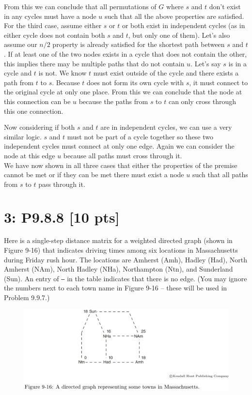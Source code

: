 \documentclass[12pt]{article}
\begin{document}
From this we can conclude that all permutations of $G$ where $s$ and $t$ don't exist in any cycles must have a node $u$ such that all the above properties are satisfied.\\

For the third case, assume either $s$ or $t$ or both exist in independent cycles (as in either cycle does not contain both $s$ and $t$, but only one of them). Let's also assume our $n/2$ property is already satisfied for the shortest path between $s$ and $t$. If at least one of the two nodes exists in a cycle that does not contain the other, this implies there may be multiple paths that do not contain $u$. Let's say $s$ is in a cycle and $t$ is not. We know $t$ must exist outside of the cycle and there exists a path from $t$ to $s$. Because $t$ does not form its own cycle with $s$, it must connect to the original cycle at only one place. From this we can conclude that the node at this connection can be $u$ because the paths from $s$ to $t$ can only cross through this one connection.

Now considering if both $s$ and $t$ are in independent cycles, we can use a very similar logic. $s$ and $t$ must not be part of a cycle together so these two independent cycles must connect at only one edge. Again we can consider the node at this edge $u$ because all paths must cross through it.\\

We have now shown in all three cases that either the properties of the premise cannot be met or if they can be met there must exist a node $u$ such that all paths from $s$ to $t$ pass through it.


\newpage
\section*{\textbf{3: P9.8.8} [10 pts]}
Here is a single-step distance matrix for a weighted directed graph (shown in Figure 9-16) that indicates driving times among six locations in Massachusetts during Friday rush hour. The locations are Amherst (Amh), Hadley (Had), North Amherst (NAm), North Hadley (NHa), Northampton (Ntn), and Sunderland (Sun). An entry of \texttt{--} in the table indicates that there is no edge. (You may ignore the numbers next to each town name in Figure 9-16 – these will be used in Problem 9.9.7.)

\begin{figure}[h]
    \centering
    \includegraphics[width=0.5\linewidth]{Fig_9-16.png}
\end{figure}
\end{document}
